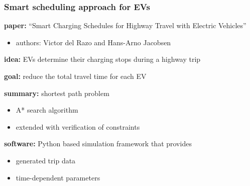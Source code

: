 \begin{frame}
\frametitle{Smart scheduling approach for EVs}

\begin{PraesentationAufzaehlung}
    \item \textbf{paper:} ``Smart Charging Schedules for Highway Travel with Electric Vehicles''
        \begin{itemize}
        \item authors: Victor del Razo and Hans-Arno Jacobsen
        \end{itemize}

    \item \textbf{idea:} EVs determine their charging stops during a highway trip

    \item \textbf{goal:} reduce the total travel time for each EV

    \item \textbf{summary:} shortest path problem
        \begin{itemize}
        \item A* search algorithm
        \item extended with verification of constraints
        \end{itemize}

    \item \textbf{software:} Python based simulation framework that provides
        \begin{itemize}
        \item generated trip data
        \item time-dependent parameters
        \end{itemize}

\end{PraesentationAufzaehlung}

\end{frame}
\clearpage

